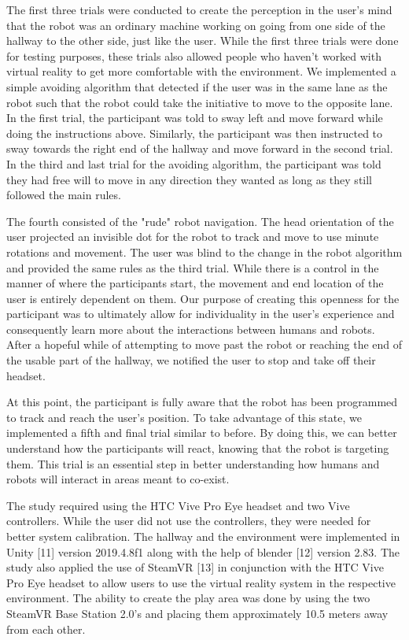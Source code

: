 \documentclass[letterpaper, 10 pt, conference]{ieeeconf}
\begin{document}
    The first three trials were conducted to create the perception in the user's mind that the robot was an ordinary machine working on going from one side of the hallway to the other side, just like the user. While the first three trials were done for testing purposes, these trials also allowed people who haven't worked with virtual reality to get more comfortable with the environment. We implemented a simple avoiding algorithm that detected if the user was in the same lane as the robot such that the robot could take the initiative to move to the opposite lane. In the first trial, the participant was told to sway left and move forward while doing the instructions above. Similarly, the participant was then instructed to sway towards the right end of the hallway and move forward in the second trial. In the third and last trial for the avoiding algorithm, the participant was told they had free will to move in any direction they wanted as long as they still followed the main rules. 
    
    The fourth consisted of the "rude" robot navigation. The head orientation of the user projected an invisible dot for the robot to track and move to use minute rotations and movement. The user was blind to the change in the robot algorithm and provided the same rules as the third trial. While there is a control in the manner of where the participants start, the movement and end location of the user is entirely dependent on them. Our purpose of creating this openness for the participant was to ultimately allow for individuality in the user's experience and consequently learn more about the interactions between humans and robots. After a hopeful while of attempting to move past the robot or reaching the end of the usable part of the hallway, we notified the user to stop and take off their headset. 
    
    
    At this point, the participant is fully aware that the robot has been programmed to track and reach the user's position. To take advantage of this state, we implemented a fifth and final trial similar to before. By doing this, we can better understand how the participants will react, knowing that the robot is targeting them. This trial is an essential step in better understanding how humans and robots will interact in areas meant to co-exist. 
    
    
    The study required using the HTC Vive Pro Eye headset and two Vive controllers. While the user did not use the controllers, they were needed for better system calibration. The hallway and the environment were implemented in Unity [11] version 2019.4.8f1 along with the help of blender [12] version 2.83. The study also applied the use of SteamVR [13] in conjunction with the HTC Vive Pro Eye headset to allow users to use the virtual reality system in the respective environment. The ability to create the play area was done by using the two SteamVR Base Station 2.0's and placing them approximately 10.5 meters away from each other. 
    
\end{document}
